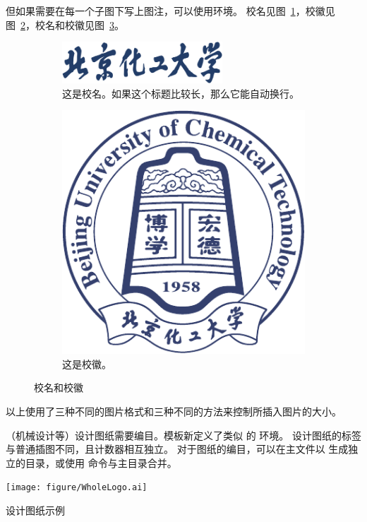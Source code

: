 但如果需要在每一个子图下写上图注，可以使用环境。
校名见图~\ref{subfig:znname}，校徽见图~\ref{subfig:logo}，校名和校徽见图~\ref{fig:wholelogo}。
\begin{figure}[H]
	\centering%
	\begin{subfigure}[t]{6cm}
		\includegraphics[width=6cm]{figure/ZNName.png}
		\caption{这是校名。如果这个标题比较长，那么它能自动换行。}\label{subfig:znname}
	\end{subfigure}
	\hspace{1cm}
	\begin{subfigure}[t]{2.5cm}
		\includegraphics[scale=0.4]{figure/Logo.pdf}
		\caption{这是校徽。}\label{subfig:logo}
	\end{subfigure}
	\caption{校名和校徽}\label{fig:wholelogo}
\end{figure}
以上使用了三种不同的图片格式和三种不同的方法来控制所插入图片的大小。

（机械设计等）设计图纸需要编目。模板新定义了类似  的 环境。
设计图纸的标签与普通插图不同，且计数器相互独立。
对于图纸的编目，可以在主文件以  生成独立的目录，或使用
命令与主目录合并。
\begin{dfigure}%
	\centering
	\texttt{[image: figure/WholeLogo.ai]}
	\caption{设计图纸示例}%
\end{dfigure}

